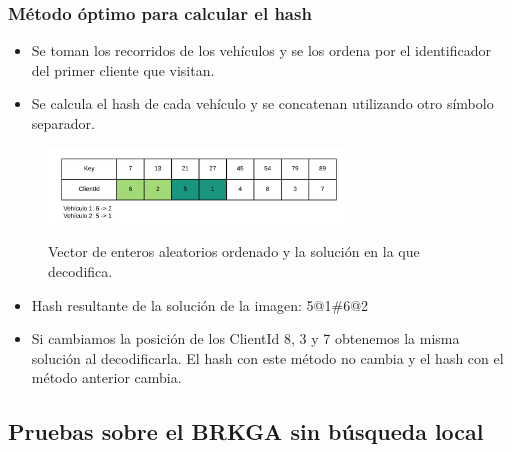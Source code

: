 \documentclass{beamer}
\begin{document}
\begin{frame}
\frametitle{Método óptimo para calcular el hash}

\begin{itemize}
    \item Se toman los recorridos de los vehículos y se los ordena por el identificador del primer cliente que visitan. 
    \pause
    \item Se calcula el hash de cada vehículo y se concatenan utilizando otro símbolo separador.
    \pause
\end{itemize}

\begin{figure}[h]
	\caption{Vector de enteros aleatorios ordenado y la solución en la que decodifica.}
	\centering
	\includegraphics[width=8cm]{DistribucionClientesDecoSimple}
	\label{fig:DistribucionClientesDecoSimple2}
\end{figure}

\begin{itemize}
    \pause
    \item Hash resultante de la solución de la imagen: 5@1\#6@2
    \pause
    \item Si cambiamos la posición de los ClientId 8, 3 y 7 obtenemos la misma solución al decodificarla. El hash con este método no cambia y el hash con el método anterior cambia.
\end{itemize}

\end{frame}


\subsection{Pruebas sobre el BRKGA sin búsqueda local}
\end{document}
